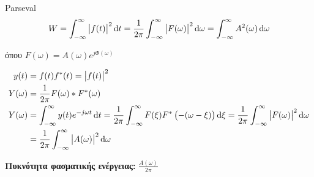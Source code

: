      
     \begin{theorem*}[title=Θεώρημα Parseval,width=\textwidth]{Parseval}
        \begin{align*}
        W = \int_{-\infty}^{\infty} \left| f(t) \right|^2\dif t
        =\frac{1}{2\pi}\int_{-\infty}^{\infty} \left|F(\omega )\right|^2
        \dif \omega = \int_{-\infty}^{\infty} A^2(\omega )\dif \omega 
        \end{align*}
        
        όπου \( \displaystyle F(\omega ) = A(\omega )e^{j\varPhi(\omega )} \)
     \end{theorem*}
     
     \begin{align*}
     y(t) &= f(t)f^*(t)=\left|f(t)\right|^2 \\
     Y(\omega ) &= \frac{1}{2\pi} F(\omega )*F^*(\omega ) \\
     Y(\omega ) &= \int_{-\infty}^{\infty} y(t)e^{-j\omega t}\dif t
     = \frac{1}{2\pi} \int_{-\infty}^{\infty} F(\xi) F^*\left(
     -(\omega -\xi) \right)\dif \xi
     = \frac{1}{2\pi}\int_{-\infty}^{\infty} \left|F(\omega )\right|^2\dif \omega 
     \\ &= \frac{1}{2\pi}\int_{-\infty}^{\infty} \left|A(\omega )\right|^2\dif\omega
     \end{align*}
     
     \begin{defn*}{}
        \textbf{Πυκνότητα φασματικής ενέργειας:}
        \(\displaystyle
        \frac{A(\omega)}{2\pi}
        \)
     \end{defn*}
     
